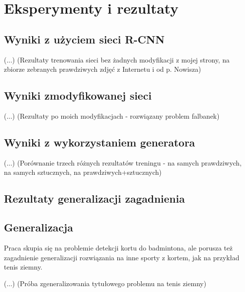 \chapter{Eksperymenty i rezultaty}

\section{Wyniki z użyciem sieci R-CNN}

(...) (Rezultaty trenowania sieci bez żadnych modyfikacji z mojej strony, na zbiorze zebranych prawdziwych zdjęć z Internetu i od p. Nowisza)

\section{Wyniki zmodyfikowanej sieci}

(...) (Rezultaty po moich modyfikacjach - rozwiązany problem falbanek)

\section{Wyniki z wykorzystaniem generatora}

(...) (Porównanie trzech różnych rezultatów treningu - na samych prawdziwych, na samych sztucznych, na prawdziwych+sztucznych)

\section{Rezultaty generalizacji zagadnienia}

\section{Generalizacja}
\label{sec:generalizacja}

Praca skupia się na problemie detekcji kortu do badmintona, ale porusza też zagadnienie generalizacji rozwiązania na inne sporty z kortem, jak na przykład tenis ziemny.

(...) (Próba zgeneralizowania tytułowego problemu na tenis ziemny)
